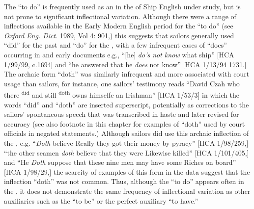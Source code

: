 The  “to do” is frequently used as an  in the  of Ship English under study, but is not prone to significant inflectional variation. Although there were a range of inflections available in the Early Modern English period for the  “to do” (see \textit{Oxford Eng. Dict.} 1989, Vol 4: 901,) this  suggests that sailors generally used “did” for the past and “do” for the , with a few infrequent cases of “does” occurring in  and early  documents e.g., “[he] \textit{do’s not know} what ship” [HCA 1/99/99, c.1694] and “he answered that he \textit{does} not know” [HCA 1/13/94 1731.] The archaic form “doth” was similarly infrequent and more associated with court usage than sailors, for instance, one sailors’ testimony reads “David Czah who there \textsuperscript{did} and still \textsuperscript{doth} owns himselfe an Irishman” [HCA 1/53/3] in which the words “did” and “doth” are inserted superscript, potentially as corrections to the sailors’ spontaneous speech that was transcribed in haste and later revised for accuracy (see also footnote in this chapter for examples of “doth” used by court officials in negated statements.) Although sailors did use this archaic inflection of the , e.g. “\textit{Doth} believe Really they got their money by pyracy” [HCA 1/98/259,] “the other seamen \textit{doth} believe that they were Likewise killed” [HCA 1/101/405,] and “He \textit{Doth} suppose that these nine men may have some Riches on board” [HCA 1/98/29,] the scarcity of examples of this form in the data suggest that the inflection “doth” was not common. Thus, although the  “to do” appears often in the , it does not demonstrate the same frequency of inflectional variation as other auxiliaries such as the  “to be” or the perfect auxiliary “to have.” 

